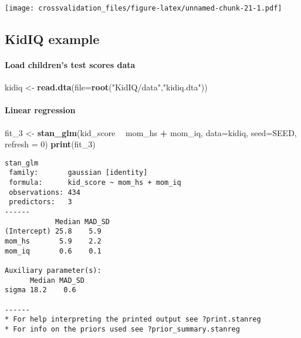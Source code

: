 \documentclass[
]{article}
\newenvironment{Shaded}{\begin{snugshade}}{\end{snugshade}}
\newcommand{\DataTypeTok}[1]{\textcolor[rgb]{0.13,0.29,0.53}{#1}}
\newcommand{\DecValTok}[1]{\textcolor[rgb]{0.00,0.00,0.81}{#1}}
\newcommand{\KeywordTok}[1]{\textcolor[rgb]{0.13,0.29,0.53}{\textbf{#1}}}
\newcommand{\NormalTok}[1]{#1}
\newcommand{\OperatorTok}[1]{\textcolor[rgb]{0.81,0.36,0.00}{\textbf{#1}}}
\newcommand{\StringTok}[1]{\textcolor[rgb]{0.31,0.60,0.02}{#1}}
\begin{document}
\texttt{[image: crossvalidation\_files/figure-latex/unnamed-chunk-21-1.pdf]}

\hypertarget{kidiq-example}{%
\subsection{KidIQ example}\label{kidiq-example}}

\hypertarget{load-childrens-test-scores-data}{%
\paragraph{Load children's test scores
data}\label{load-childrens-test-scores-data}}

\begin{Shaded}
\begin{Highlighting}[]
\NormalTok{kidiq <-}\StringTok{ }\KeywordTok{read.dta}\NormalTok{(}\DataTypeTok{file=}\KeywordTok{root}\NormalTok{(}\StringTok{"KidIQ/data"}\NormalTok{,}\StringTok{"kidiq.dta"}\NormalTok{))}
\end{Highlighting}
\end{Shaded}

\hypertarget{linear-regression}{%
\paragraph{Linear regression}\label{linear-regression}}

\begin{Shaded}
\begin{Highlighting}[]
\NormalTok{fit_}\DecValTok{3}\NormalTok{ <-}\StringTok{ }\KeywordTok{stan_glm}\NormalTok{(kid_score }\OperatorTok{~}\StringTok{ }\NormalTok{mom_hs }\OperatorTok{+}\StringTok{ }\NormalTok{mom_iq, }\DataTypeTok{data=}\NormalTok{kidiq,}
                  \DataTypeTok{seed=}\NormalTok{SEED, }\DataTypeTok{refresh =} \DecValTok{0}\NormalTok{)}
\KeywordTok{print}\NormalTok{(fit_}\DecValTok{3}\NormalTok{)}
\end{Highlighting}
\end{Shaded}

\begin{verbatim}
stan_glm
 family:       gaussian [identity]
 formula:      kid_score ~ mom_hs + mom_iq
 observations: 434
 predictors:   3
------
            Median MAD_SD
(Intercept) 25.8    5.9  
mom_hs       5.9    2.2  
mom_iq       0.6    0.1  

Auxiliary parameter(s):
      Median MAD_SD
sigma 18.2    0.6  

------
* For help interpreting the printed output see ?print.stanreg
* For info on the priors used see ?prior_summary.stanreg
\end{verbatim}
\end{document}
